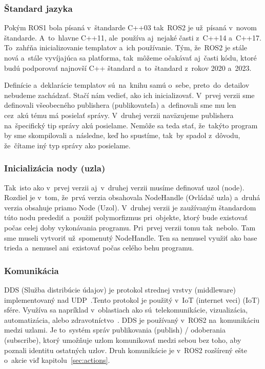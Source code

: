 \subsubsection{Štandard jazyka}

	Pokým ROS1 bola písaná v~štandarde C++03 tak~ROS2 je už~písaná v~novom štandarde. A~to~hlavne C++11, ale~používa aj~nejaké časti z~C++14
	a~C++17. To~zahŕňa inicializovanie templatov a~ich používanie. Tým, že~ROS2 je stále nová a~stále vyvíjajúca sa platforma, tak~môžeme očakávať aj~časti
	kódu, ktoré budú podporovať najnovší C++ štandard a~to~štandard z~rokov 2020 a~2023.

	Definície a~deklarácie templatov sú~na~knihu samú o~sebe, preto~do~detailov nebudeme zachádzať. Stačí nám vedieť, ako ich inicializovať.
	V~prvej verzii sme definovali všeobecného publishera (publikovateľa) a~definovali sme mu len cez~akú tému má posielať správy. V~druhej verzii
	naväzujeme publishera na~špecifický tip správy akú posielame. Nemôže sa teda stať, že~takýto program by sme skompilovali a~následne, keď
	ho spustíme, tak~by spadol z~dôvodu, že~čítame iný typ správy ako posielame.

\subsubsection{Inicializácia nody (uzla)}

	Tak~isto ako v~prvej verzii aj~v~druhej verzii musíme definovať uzol (node). Rozdiel je v~tom, že~prvá verzia obsahovala NodeHandle (Ovládač uzla)
	a~druhá verzia obsahuje priamo Node (Uzol). V~druhej verzii je zaužívaným štandardom túto nodu predediť a~použiť polymorfizmus pri~objekte,
	ktorý bude existovať počas celej doby vykonávania programu. Pri~prvej verzii tomu tak~nebolo. Tam sme museli vytvoriť už~spomenutý NodeHandle.
	Ten sa nemusel využiť ako base trieda a~nemusel ani~existovať počas celého behu programu.

\subsubsection{Komunikácia}

	DDS (Služba distribúcie údajov) je protokol strednej vrstvy (middleware) implementovaný nad
	UDP~\cite{ROS2book}.Tento protokol je použitý v~IoT (internet veci) (\acrlong{IoT}) sfére.
	Využíva sa napríklad v~oblastiach ako sú~telekomunikácie, vizualizácia, automatizácia, alebo
	zdravotníctvo~\cite{siteTrend}. DDS je používaný v~ROS2 na~komunikáciu medzi uzlami.
	Je to~systém správ publikovania (publish) / odoberania (subscribe), ktorý umožňuje uzlom
	komunikovať medzi sebou bez toho, aby poznali identitu ostatných uzlov. Druh komunikácie
	je v~ROS2 rozšírený ešte o~akcie viď kapitolu~\ref{sec:actions}.

